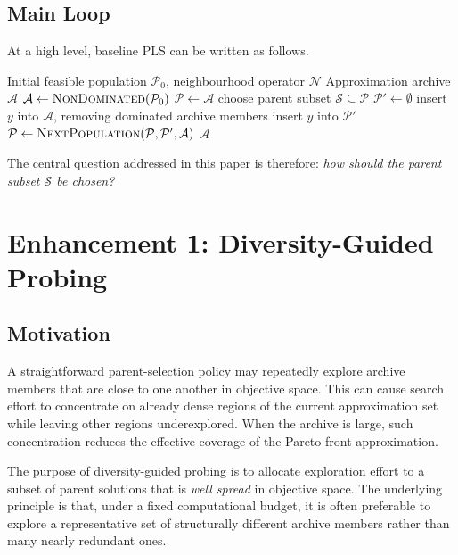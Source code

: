 \documentclass[11pt,a4paper]{article}
\newcommand{\calA}{\ensuremath{\mathcal{A}}}
\newcommand{\calN}{\ensuremath{\mathcal{N}}}
\newcommand{\calP}{\ensuremath{\mathcal{P}}}
\newcommand{\calS}{\ensuremath{\mathcal{S}}}
\begin{document}
\subsection{Main Loop}

At a high level, baseline PLS can be written as follows.

\begin{algorithm}[htbp]
\caption{Baseline Pareto Local Search}
\label{alg:pls}
\begin{algorithmic}[1]
\Input Initial feasible population \(\calP_0\), neighbourhood operator \(\calN\)
\Output Approximation archive \(\calA\)
\State \(\calA \gets \textsc{NonDominated}(\calP_0)\)
\State \(\calP \gets \calA\)
  \State choose parent subset \(\calS \subseteq \calP\)
  \State \(\calP' \gets \emptyset\)
  \ForEach{\(x \in \calS\)}
    \ForEach{\(y \in \calN(x)\)}
      \If{\(y\) is not dominated by \(\calA\)}
        \State insert \(y\) into \(\calA\), removing dominated archive members
        \State insert \(y\) into \(\calP'\)
      \EndIf
    \EndFor
  \EndFor
  \State \(\calP \gets \textsc{NextPopulation}(\calP,\calP',\calA)\)
\EndWhile
\State \Return \calA
\end{algorithmic}
\end{algorithm}

The central question addressed in this paper is therefore: \emph{how should the parent subset \(\calS\) be chosen?}

\section{Enhancement 1: Diversity-Guided Probing}\label{sec:diverse}

\subsection{Motivation}

A straightforward parent-selection policy may repeatedly explore archive
members that are close to one another in objective space.  This can
cause search effort to concentrate on already dense regions of the
current approximation set while leaving other regions underexplored.
When the archive is large, such concentration reduces the effective
coverage of the Pareto front approximation.

The purpose of diversity-guided probing is to allocate exploration
effort to a subset of parent solutions that is \emph{well spread} in
objective space.  The underlying principle is that, under a fixed
computational budget, it is often preferable to explore a representative
set of structurally different archive members rather than many nearly
redundant ones.
\end{document}
